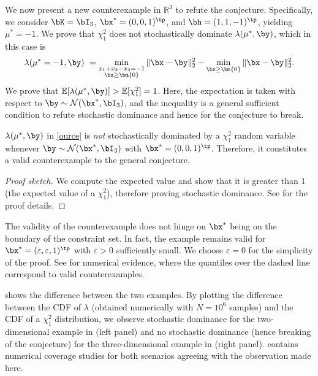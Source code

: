 \documentclass[11pt]{article}
\numberwithin{equation}{section}
\numberwithin{figure}{section}
\begin{document}
We now present a new counterexample in $\mathbb{R}^3$ to refute the \rustburrus conjecture. 
Specifically, we consider $\bK = \bI_3$, $\bx^* = (0,0,1)^\tp$, and $\bh = (1,1,-1)^\tp$, yielding $\mu^* = -1$. 
We prove that $\chi^2_1$ does not stochastically dominate $\lambda(\mu^*, \by)$, which in this case is
\begin{equation}\label{ource}
\lambda(\mu^* = -1, \by) ~= \min_{\substack{x_1 + x_2 -x_3 = -1\\ \bx \geq \bm{0}}} \Vert \bx -\by \Vert^2_2 - \min_{\bx \geq \bm{0} } \Vert \bx-\by \Vert^2_2.
\end{equation}
We prove that $\mathbb{E}[\lambda(\mu^*, \by)] > \mathbb{E}[\chi^2_1] = 1$. 
Here, the expectation is taken with respect to $\by \sim \mathcal N(\bx^*, \bI_3)$, and the inequality is a general sufficient condition to refute stochastic dominance and hence for the conjecture to break.
\begin{lemma}
    \label{lem:3d-counterexample}
    $\lambda(\mu^*, \by)$ in \eqref{ource} is \emph{not} stochastically dominated by a $\chi^2_1$ random variable whenever $\by \sim \mathcal N(\bx^*, \bI_3)$ with $\bx^* = (0,0,1)^\tp$. 
    Therefore, it constitutes a valid counterexample to the general conjecture.
\end{lemma}
\begin{proof}[Proof sketch]
We compute the expected value and show that it is greater than 1 (the expected value of a $\chi^2_1$), therefore proving stochastic dominance. 
See  for the proof details.
\end{proof}

\begin{remark}
    The validity of the counterexample does not hinge on $\bx^*$ being on the boundary of the constraint set. 
    In fact, the example remains valid for $\bx^* = (\varepsilon, \varepsilon, 1)^\tp$ with $\varepsilon > 0$ sufficiently small. 
    We choose $\varepsilon = 0$ for the simplicity of the proof. 
    See  for numerical evidence, where the quantiles over the dashed line correspond to valid counterexamples.
\end{remark}

 shows the difference between the two examples. 
By plotting the difference between the CDF of $\lambda$ (obtained numerically with $N = 10^6$ samples) and the CDF of a $\chi^2_1$ distribution, we observe stochastic dominance for the two-dimensional example in  (left panel) and no stochastic dominance (hence breaking of the conjecture) for the three-dimensional example in  (right panel).  contains numerical coverage studies for both scenarios agreeing with the observation made here.
\end{document}
